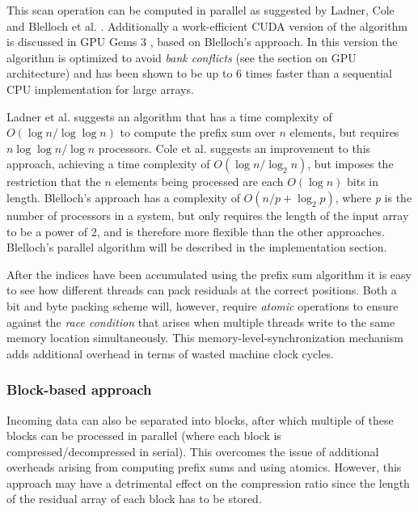  This scan operation can be computed in parallel as suggested by Ladner, Cole and Blelloch et al. \cite{ladner1980parallel,cole1989faster,blelloch1990prefix}.
 Additionally a work-efficient CUDA version of the algorithm is discussed in GPU Gems 3 \cite{harris2007parallel}, based on Blelloch's approach. In this version the algorithm is optimized 
 to avoid \textit{bank conflicts} (see the section on GPU architecture) and has been shown to be up to 6 times faster than a sequential CPU implementation for large arrays.
 
 Ladner et al. suggests an algorithm that has a time complexity of $O(\log{n}/\log{\log{n}})$ to compute the prefix sum over $n$ elements, but requires $n\log\log{n}/\log{n}$ processors. 
 Cole et al. suggests an improvement to this approach, achieving a time complexity of $O(\log{n}/\log_2{n})$, but imposes the restriction that the $n$ elements being processed are each $O(\log{n})$ bits in length.
 Blelloch's approach has a complexity of $O(n/p + \log_2{p})$, where \textit{p} is the number of processors in a system, but only requires the length of the input array to be a power of 
 2, and is therefore more flexible than the other approaches. Blelloch's parallel algorithm will be described in the implementation section.
 
 After the indices have been accumulated using the prefix sum algorithm it is easy to see how different threads can pack residuals at the correct positions. Both a bit and byte
 packing scheme will, however, require \textit{atomic} operations to ensure against the \textit{race condition} that arises when multiple threads write to the same memory 
 location simultaneously. This memory-level-synchronization mechanism adds additional overhead in terms of wasted machine clock cycles.
 \subsubsection{Block-based approach}
 Incoming data can also be separated into blocks, after which multiple of these blocks can be processed in parallel (where each block is compressed/decompressed in serial). This overcomes the issue of 
 additional overheads arising from computing prefix sums and using atomics. However, this approach may have a detrimental effect on the compression ratio since the length of the residual array of each block 
 has to be stored.
